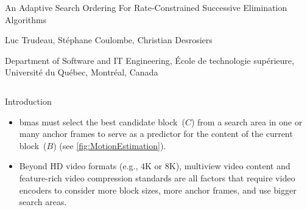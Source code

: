 \documentclass[10pt]{beamer}
\begin{document}

\begin{frame}[t]
    \centering
    
    
    \huge{An Adaptive Search Ordering For Rate-Constrained Successive Elimination Algorithms}
    
    \LARGE{Luc Trudeau, Stéphane Coulombe, Christian Desrosiers}
    
    \Large{Department of Software and IT Engineering, École de technologie supérieure, Université du Québec, Montréal, Canada}
    
    \normalsize
    
\begin{columns}[t, onlytextwidth]
    \begin{column}{0.32\textwidth}
        \begin{block}{Introduction}
            \begin{itemize}
                
            \item \Glspl{bma} must select the best candidate block~($C$) from a search area in one or many anchor frames to serve as a predictor for the content of the current block~($B$) (see \cref{fig:MotionEstimation}).
                
            \item Beyond HD video formats (e.g., $4\text{K}$ or $8\text{K}$), multiview video content  and feature-rich video compression standards are all factors that require video encoders to consider more block sizes, more anchor frames, and use bigger search areas.
                

\end{itemize}
\end{block}
\end{column}
\end{columns}
\end{frame}
\end{document}
